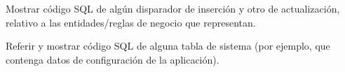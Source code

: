 
\begin{shaded}
Mostrar código SQL de algún disparador de inserción y otro de actualización, relativo a las entidades/reglas de negocio que representan.
\end{shaded}


\begin{shaded}
Referir y mostrar código SQL de alguna tabla de sistema (por ejemplo, que contenga datos de configuración de la aplicación).
\end{shaded}